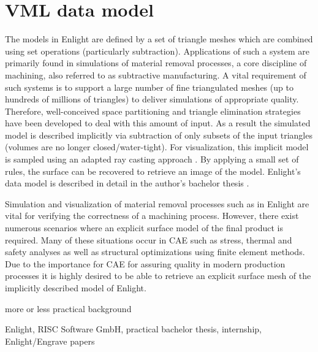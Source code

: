 \chapter{VML data model}
\label{sec:vml_data_model}




The models in Enlight are defined by a set of triangle meshes which are combined using set operations (particularly subtraction).
Applications of such a system are primarily found in simulations of material removal processes, a core discipline of machining, also referred to as subtractive manufacturing.
A vital requirement of such systems is to support a large number of fine triangulated meshes (up to hundreds of millions of triangles) to deliver simulations of appropriate quality.
Therefore, well-conceived space partitioning and triangle elimination strategies have been developed to deal with this amount of input.
As a result the simulated model is described implicitly via subtraction of only subsets of the input triangles (volumes are no longer closed/water-tight).
For visualization, this implicit model is sampled using an adapted ray casting approach \cite{enlight}.
By applying a small set of rules, the surface can be recovered to retrieve an image of the model.
Enlight's data model is described in detail in the author's bachelor thesis \cite{bachelor}.

Simulation and visualization of material removal processes such as in Enlight are vital for verifying the correctness of a machining process.
However, there exist numerous scenarios where an explicit surface model of the final product is required.
Many of these situations occur in CAE such as stress, thermal and safety analyses as well as structural optimizations using finite element methods.
Due to the importance for CAE for assuring quality in modern production processes it is highly desired to be able to retrieve an explicit surface mesh of the implicitly described model of Enlight.



more or less practical background

Enlight, RISC Software GmbH, practical bachelor thesis, internship, Enlight/Engrave papers
